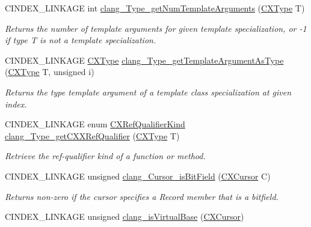\begin{DoxyCompactItemize}
C\+I\+N\+D\+E\+X\+\_\+\+L\+I\+N\+K\+A\+GE int \mbox{\hyperlink{group__CINDEX__TYPES_ga13f25981892e38c345d609b56ae1ee9c}{clang\+\_\+\+Type\+\_\+get\+Num\+Template\+Arguments}} (\mbox{\hyperlink{structCXType}{C\+X\+Type}} T)
\begin{DoxyCompactList}\small\item\em Returns the number of template arguments for given template specialization, or -\/1 if type {\ttfamily T} is not a template specialization. \end{DoxyCompactList}\item 
C\+I\+N\+D\+E\+X\+\_\+\+L\+I\+N\+K\+A\+GE \mbox{\hyperlink{structCXType}{C\+X\+Type}} \mbox{\hyperlink{group__CINDEX__TYPES_ga9645640281c8d088982b2133f58edcb3}{clang\+\_\+\+Type\+\_\+get\+Template\+Argument\+As\+Type}} (\mbox{\hyperlink{structCXType}{C\+X\+Type}} T, unsigned i)
\begin{DoxyCompactList}\small\item\em Returns the type template argument of a template class specialization at given index. \end{DoxyCompactList}\item 
C\+I\+N\+D\+E\+X\+\_\+\+L\+I\+N\+K\+A\+GE enum \mbox{\hyperlink{group__CINDEX__TYPES_ga28389bbe03a77eded92086f0011d86eb}{C\+X\+Ref\+Qualifier\+Kind}} \mbox{\hyperlink{group__CINDEX__TYPES_ga9eefb424da6ca291285dd50f82006b26}{clang\+\_\+\+Type\+\_\+get\+C\+X\+X\+Ref\+Qualifier}} (\mbox{\hyperlink{structCXType}{C\+X\+Type}} T)
\begin{DoxyCompactList}\small\item\em Retrieve the ref-\/qualifier kind of a function or method. \end{DoxyCompactList}\item 
\mbox{\label{group__CINDEX__TYPES_ga750705f6b418b25ca00495b7392c740d}} 
C\+I\+N\+D\+E\+X\+\_\+\+L\+I\+N\+K\+A\+GE unsigned \mbox{\hyperlink{group__CINDEX__TYPES_ga750705f6b418b25ca00495b7392c740d}{clang\+\_\+\+Cursor\+\_\+is\+Bit\+Field}} (\mbox{\hyperlink{structCXCursor}{C\+X\+Cursor}} C)
\begin{DoxyCompactList}\small\item\em Returns non-\/zero if the cursor specifies a Record member that is a bitfield. \end{DoxyCompactList}\item 
\mbox{\label{group__CINDEX__TYPES_ga1e3db635bc5615910f9b3a2b02fe87f0}} 
C\+I\+N\+D\+E\+X\+\_\+\+L\+I\+N\+K\+A\+GE unsigned \mbox{\hyperlink{group__CINDEX__TYPES_ga1e3db635bc5615910f9b3a2b02fe87f0}{clang\+\_\+is\+Virtual\+Base}} (\mbox{\hyperlink{structCXCursor}{C\+X\+Cursor}})

\end{DoxyCompactItemize}
